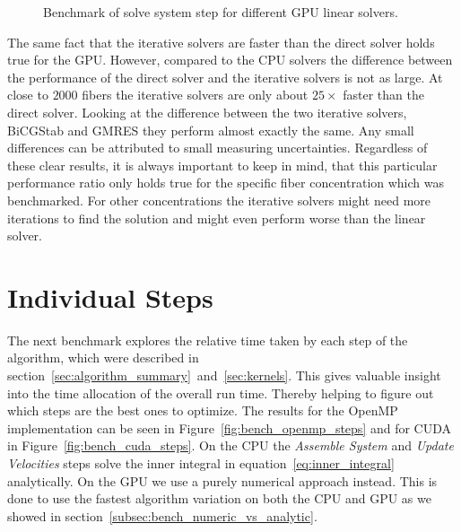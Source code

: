 \begin{figure}[!htbp]
  \centering
  \caption{Benchmark of solve system step for different GPU linear solvers.}
  \label{fig:bench_cuda_solvers}
\end{figure}

The same fact that the iterative solvers are faster than the direct solver holds true for the GPU. However, compared to the CPU solvers the difference between the performance of the direct solver and the iterative solvers is not as large. At close to $2000$ fibers the iterative solvers are only about $25×$ faster than the direct solver. Looking at the difference between the two iterative solvers, BiCGStab and GMRES they perform almost exactly the same. Any small differences can be attributed to small measuring uncertainties. Regardless of these clear results, it is always important to keep in mind, that this particular performance ratio only holds true for the specific fiber concentration which was benchmarked. For other concentrations the iterative solvers might need more iterations to find the solution and might even perform worse than the linear solver.

\section{Individual Steps}

The next benchmark explores the relative time taken by each step of the algorithm, which were described in section~\ref{sec:algorithm_summary}~and~\ref{sec:kernels}. This gives valuable insight into the time allocation of the overall run time. Thereby helping to figure out which steps are the best ones to optimize. The results for the OpenMP implementation can be seen in Figure~\ref{fig:bench_openmp_steps} and for CUDA in Figure~\ref{fig:bench_cuda_steps}. On the CPU the \emph{Assemble System} and \emph{Update Velocities} steps solve the inner integral in equation~\eqref{eq:inner_integral} analytically. On the GPU we use a purely numerical approach instead. This is done to use the fastest algorithm variation on both the CPU and GPU as we showed in section~\ref{subsec:bench_numeric_vs_analytic}.

